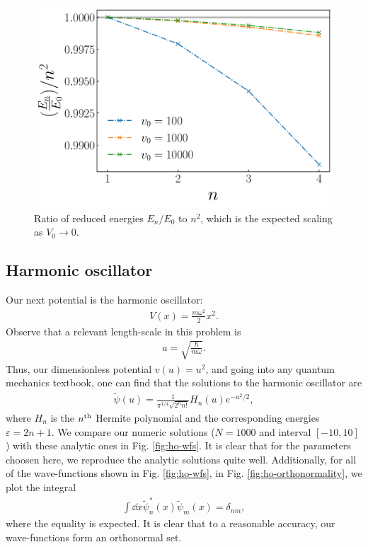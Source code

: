 \begin{figure}[h!tb]
    \centering
    \includegraphics[width=0.5\linewidth]{finite_well_spectrum.pdf}
    \caption{Ratio of reduced energies $E_{n}/E_0$ to $n^2$, which is the expected scaling as $V_0 \rightarrow 0$.}
    \label{fig:finite-well-spectrum}
\end{figure}


\subsection{Harmonic oscillator}
\label{ssec:harmonic-oscillator}

Our next potential is the harmonic oscillator:
\begin{align}
    V(x) = \frac{m \omega^2}{2} x^2
.\end{align}
Observe that a relevant length-scale in this problem is
\begin{align}
    a = \sqrt{\frac{\hbar}{m \omega}}
.\end{align}
Thus, our dimensionless potential $v(u) = u^2$, and going into any quantum mechanics textbook, one can find that the solutions to the harmonic oscillator are
\begin{align}
    \tilde{\psi}(u) = \frac{1}{\pi^{1/4} \sqrt{2^{n} n!}} H_{n}(u) e^{-u^2 / 2}
,\end{align}
where $H_{n}$ is the $n^{\rm th}$ Hermite polynomial and the corresponding energies $\varepsilon = 2n + 1$.
We compare our numeric solutions ($N = 1000$ and interval $[-10,10]$) with these analytic ones in Fig. \ref{fig:ho-wfs}.
It is clear that for the parameters choosen here, we reproduce the analytic solutions quite well.
Additionally, for all of the wave-functions shown in Fig. \ref{fig:ho-wfs}, in Fig. \ref{fig:ho-orthonormality}, we plot the integral
\begin{align}
    \int \dd{x} \tilde{\psi}_{n}^{*}(x) \tilde{\psi}_{m}(x) = \delta_{nm}
,\end{align}
where the equality is expected.
It is clear that to a reasonable accuracy, our wave-functions form an orthonormal set.

